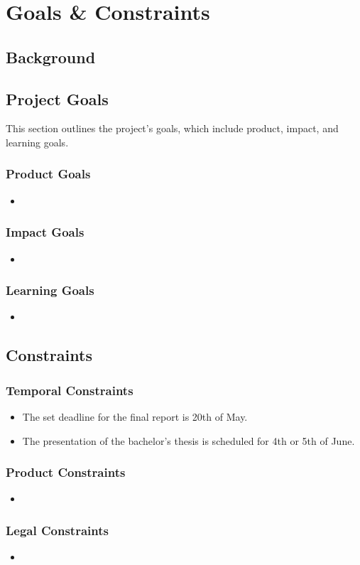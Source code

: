 \section{Goals \& Constraints}
\subsection{Background}


\subsection{Project Goals}
This section outlines the project's goals, which include product, impact, and learning goals.
\subsubsection{Product Goals}
\begin{itemize}
    \item 
\end{itemize}

\subsubsection{Impact Goals}
\begin{itemize}
    \item 
\end{itemize}

\subsubsection{Learning Goals}
\begin{itemize}
    \item 
\end{itemize}


\subsection{Constraints}
\subsubsection{Temporal Constraints}
\begin{itemize}
    \item The set deadline for the final report is 20th of May.
    \item The presentation of the bachelor's thesis is scheduled for 4th or 5th of June.
\end{itemize}

\subsubsection{Product Constraints}
\begin{itemize}
    \item 
\end{itemize}

\subsubsection{Legal Constraints}
\begin{itemize}
    \item 
\end{itemize}